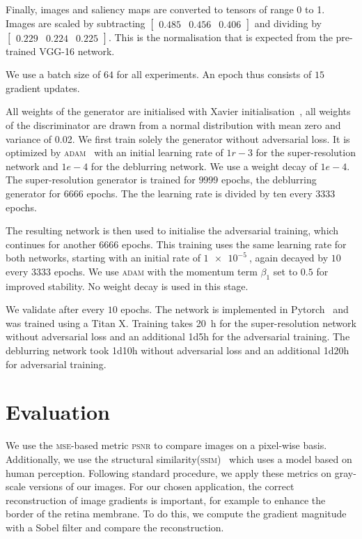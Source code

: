\documentclass{scrartcl}
\begin{document}
Finally, images and saliency maps are converted to tensors of range 0 to 1.
Images are scaled by subtracting
\(
\begin{bmatrix}
 0.485 & 0.456 & 0.406 
\end{bmatrix}
\)
and dividing by
\(
\begin{bmatrix}
0.229 & 0.224& 0.225
\end{bmatrix}
\).
This is the normalisation that is expected from the pre-trained VGG-16 network.

We use a batch size of $64$ for all experiments.
An epoch thus consists of $15$ gradient updates.

All weights of the generator are initialised with Xavier initialisation~\cite{Xavier}, all weights of the discriminator are drawn from a normal distribution with mean zero and variance of 0.02. 
We first train solely the generator without adversarial loss.
It is optimized by \textsc{adam}~\cite{Adam} with an initial learning rate of $1r-3$ for the super-resolution network and $1e-4$ for the deblurring network.
We use a weight decay of $1e-4$.
The super-resolution generator is trained for $9999$ epochs, the deblurring generator for $6666$ epochs.
The the learning rate is divided by ten every $3333$ epochs.

The resulting network is then used to initialise the adversarial training, which continues for another $6666$ epochs.
This training uses the same learning rate for both networks, starting with an initial rate of $\SI{1e-5}{}$, again decayed by $10$ every $3333$ epochs.
We use \textsc{adam} with the momentum term $\beta_1$ set to $0.5$ for improved stability.
No weight decay is used in this stage.

We validate after every $10$ epochs.
The network is implemented in Pytorch~\cite{Pytorch} and was trained using a Titan X.
Training takes \SI{20}{\hour} for the super-resolution network without adversarial loss and an additional 1d5h for the adversarial training.
The deblurring network took 1d10h without adversarial loss and an additional 1d20h for adversarial training.

\section{Evaluation}
We use the \textsc{mse}-based metric \textsc{psnr} to compare images on a pixel-wise basis.
Additionally, we use the structural similarity(\textsc{ssim})~\cite{Ssim} which uses a model based on human perception.
Following standard procedure, we apply these metrics on gray-scale versions of our images.
For our chosen application, the correct reconstruction of image gradients is important, for example to enhance the border of the retina membrane.
To do this, we compute the gradient magnitude with a Sobel filter and compare the reconstruction.
\end{document}
